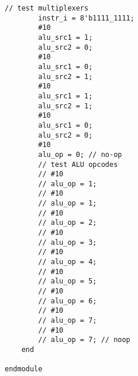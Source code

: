 \documentclass{article}
\begin{document}
\begin{lstlisting}[style=verilog-style]
		// test multiplexers
		instr_i = 8'b1111_1111;
		#10
		alu_src1 = 1;
		alu_src2 = 0;
		#10
		alu_src1 = 0;
		alu_src2 = 1;
		#10
		alu_src1 = 1;
		alu_src2 = 1;
		#10
		alu_src1 = 0;
		alu_src2 = 0;
		#10
		alu_op = 0; // no-op
		// test ALU opcodes
		// #10
		// alu_op = 1;
		// #10
		// alu_op = 1;
		// #10
		// alu_op = 2;
		// #10
		// alu_op = 3;
		// #10
		// alu_op = 4;
		// #10
		// alu_op = 5;
		// #10
		// alu_op = 6;
		// #10
		// alu_op = 7;
		// #10
		// alu_op = 7; // noop
	end

endmodule
\end{lstlisting}
\end{document}
